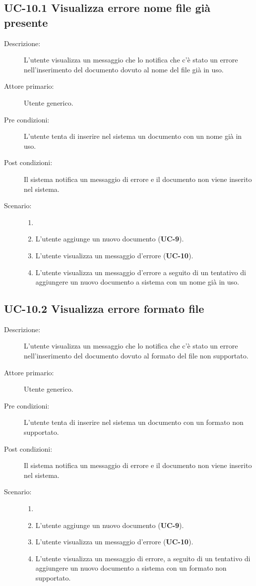 \subsection{UC-10.1 Visualizza errore nome file già presente}
\begin{description}
    \item[Descrizione:] L'utente visualizza un messaggio che lo notifica che c'è stato un errore nell'inserimento del documento dovuto al nome del file già in uso.
    \item[Attore primario:] Utente generico.
    \item[Pre condizioni:] L'utente tenta di inserire nel sistema un documento con un nome già in uso.
    \item[Post condizioni:] Il sistema notifica un messaggio di errore e il documento non viene inserito nel sistema.
    \item[Scenario:]
    \begin{enumerate}
        \item[]
        \item L’utente aggiunge un nuovo documento (\textbf{UC-9}).
        \item L'utente visualizza un messaggio d'errore (\textbf{UC-10}).
        \item L'utente visualizza un messaggio d'errore a seguito di un tentativo di aggiungere un nuovo documento a sistema con un nome già in uso.
    \end{enumerate}
\end{description}

\subsection{UC-10.2 Visualizza errore formato file}
\begin{description}
    \item[Descrizione:] L'utente visualizza un messaggio che lo notifica che c'è stato un errore nell'inserimento del documento dovuto al formato del file non supportato.
    \item[Attore primario:] Utente generico.
    \item[Pre condizioni:] L'utente tenta di inserire nel sistema un documento con un formato non supportato.
    \item[Post condizioni:] Il sistema notifica un messaggio di errore e il documento non viene inserito nel sistema.
    \item[Scenario:] 
    \begin{enumerate}
        \item[]
        \item L’utente aggiunge un nuovo documento (\textbf{UC-9}).
        \item L'utente visualizza un messaggio d'errore (\textbf{UC-10}).
        \item L'utente visualizza un messaggio di errore, a seguito di un tentativo di aggiungere un nuovo documento a sistema con un formato non supportato.
    \end{enumerate}
\end{description}

